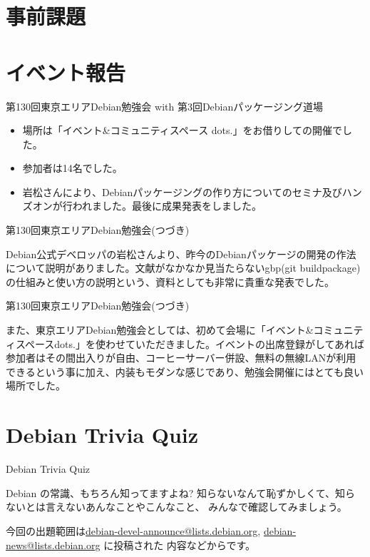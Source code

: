 \section{事前課題}
{\footnotesize
 
}

\section{イベント報告}

\begin{frame}{第130回東京エリアDebian勉強会 with 第3回Debianパッケージング道場 }

\begin{itemize}
\item 場所は「イベント\&コミュニティスペース dots.」をお借りしての開催でした。
\item 参加者は14名でした。
\item 岩松さんにより、Debianパッケージングの作り方についてのセミナ及びハンズオンが行われました。最後に成果発表をしました。
\end{itemize} 
  
\end{frame}

\begin{frame}{第130回東京エリアDebian勉強会(つづき)}

  Debian公式デベロッパの岩松さんより、昨今のDebianパッケージの開発の作法について説明がありました。文献がなかなか見当たらないgbp(git buildpackage)の仕組みと使い方の説明という、資料としても非常に貴重な発表でした。

  
\end{frame}

\begin{frame}{第130回東京エリアDebian勉強会(つづき)}

  また、東京エリアDebian勉強会としては、初めて会場に「イベント\&コミュニティスペースdots.」を使わせていただきました。イベントの出席登録がしてあれば参加者はその間出入りが自由、コーヒーサーバー併設、無料の無線LANが利用できるという事に加え、内装もモダンな感じであり、勉強会開催にはとても良い場所でした。

\end{frame}
  
\section{Debian Trivia Quiz}
\begin{frame}{Debian Trivia Quiz}

  Debian の常識、もちろん知ってますよね?
知らないなんて恥ずかしくて、知らないとは言えないあんなことやこんなこと、
みんなで確認してみましょう。

今回の出題範囲は\url{debian-devel-announce@lists.debian.org},
\url{debian-news@lists.debian.org} に投稿された
内容などからです。

\end{frame}

